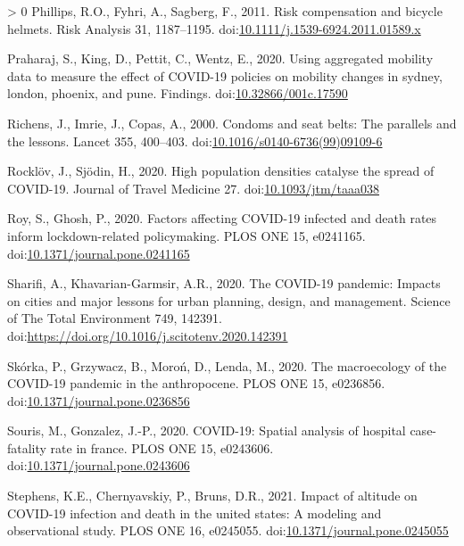 \documentclass[]{elsarticle} %
\newlength{\cslhangindent}
\newenvironment{CSLReferences}[3] %
 {%
  \setlength{\parindent}{0pt}
  \ifodd #1 \everypar{\setlength{\hangindent}{\cslhangindent}}\ignorespaces\fi
  \ifnum #2 > 0
  \setlength{\parskip}{#2\baselineskip}
  \fi
 }%
 {}
\begin{document}
\begin{CSLReferences}{1}{0}
\leavevmode\hypertarget{ref-Phillips2011risk}{}%
Phillips, R.O., Fyhri, A., Sagberg, F., 2011. Risk compensation and
bicycle helmets. Risk Analysis 31, 1187--1195.
doi:\href{https://doi.org/10.1111/j.1539-6924.2011.01589.x}{10.1111/j.1539-6924.2011.01589.x}

\leavevmode\hypertarget{ref-Praharaj2020Using}{}%
Praharaj, S., King, D., Pettit, C., Wentz, E., 2020. Using aggregated
mobility data to measure the effect of COVID-19 policies on mobility
changes in sydney, london, phoenix, and pune. Findings.
doi:\href{https://doi.org/10.32866/001c.17590}{10.32866/001c.17590}

\leavevmode\hypertarget{ref-Richens2000condoms}{}%
Richens, J., Imrie, J., Copas, A., 2000. Condoms and seat belts: The
parallels and the lessons. Lancet 355, 400--403.
doi:\href{https://doi.org/10.1016/s0140-6736(99)09109-6}{10.1016/s0140-6736(99)09109-6}

\leavevmode\hypertarget{ref-Rocklov2020high}{}%
Rocklöv, J., Sjödin, H., 2020. High population densities catalyse the
spread of COVID-19. Journal of Travel Medicine 27.
doi:\href{https://doi.org/10.1093/jtm/taaa038}{10.1093/jtm/taaa038}

\leavevmode\hypertarget{ref-Roy2020factors}{}%
Roy, S., Ghosh, P., 2020. Factors affecting COVID-19 infected and death
rates inform lockdown-related policymaking. PLOS ONE 15, e0241165.
doi:\href{https://doi.org/10.1371/journal.pone.0241165}{10.1371/journal.pone.0241165}

\leavevmode\hypertarget{ref-Sharifi2020covid}{}%
Sharifi, A., Khavarian-Garmsir, A.R., 2020. The COVID-19 pandemic:
Impacts on cities and major lessons for urban planning, design, and
management. Science of The Total Environment 749, 142391.
doi:\url{https://doi.org/10.1016/j.scitotenv.2020.142391}

\leavevmode\hypertarget{ref-Skorka2020macroecology}{}%
Skórka, P., Grzywacz, B., Moroń, D., Lenda, M., 2020. The macroecology
of the COVID-19 pandemic in the anthropocene. PLOS ONE 15, e0236856.
doi:\href{https://doi.org/10.1371/journal.pone.0236856}{10.1371/journal.pone.0236856}

\leavevmode\hypertarget{ref-Souris2020covid}{}%
Souris, M., Gonzalez, J.-P., 2020. COVID-19: Spatial analysis of
hospital case-fatality rate in france. PLOS ONE 15, e0243606.
doi:\href{https://doi.org/10.1371/journal.pone.0243606}{10.1371/journal.pone.0243606}

\leavevmode\hypertarget{ref-Stephens2021impact}{}%
Stephens, K.E., Chernyavskiy, P., Bruns, D.R., 2021. Impact of altitude
on COVID-19 infection and death in the united states: A modeling and
observational study. PLOS ONE 16, e0245055.
doi:\href{https://doi.org/10.1371/journal.pone.0245055}{10.1371/journal.pone.0245055}


\end{CSLReferences}
\end{document}

